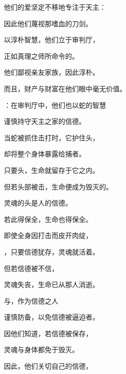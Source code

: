 他们的爱坚定不移地专注于天主：\par

因此他们蔑视那嗜血的刀剑。\par

以淳朴智慧，他们立于审判厅，\par

正如真理之师所命令的。\par

他们鄙视亲友家族，因此淳朴。\par

而且，财产与财富在他们眼中毫无价值。\par

：在审判厅中，他们也以蛇的智慧\par

谨慎持守天主之家的信德。\par

当蛇被抓住击打时，它护住头，\par

却将整个身体暴露给捕者。\par

只要头，生命就留存于它之内。\par

但若头部被击，生命便成为毁灭的。\par

灵魂的头是人的信德。\par

若此得保全，生命也得保全。\par

即使全身因打击而皮开肉绽，\par

，只要信德犹存，灵魂就活着。\par

但若信德被不信，\par

灵魂失丧，生命已从那人消逝。\par

与，作为信德之人\par

谨慎防备，以免信德被逼迫者。\par

因他们知道，若信德被保存，\par

灵魂与身体都免于毁灭。\par

因此，他们关切自己的信德，\par


